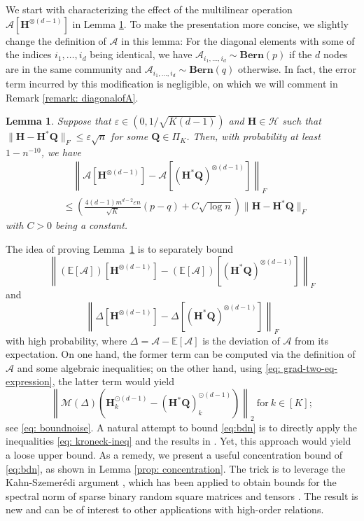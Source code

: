 \documentclass{article}
\theoremstyle{plain}
\newtheorem{lemma}[theorem]{Lemma}
\theoremstyle{definition}
\theoremstyle{remark}
\newcommand{\BH}{\bm{H}}
\newcommand{\BQ}{\bm{Q}}
\newcommand{\HCal}{\mathcal{H}}
\newcommand{\ACal}{\mathcal{A}}
\newcommand{\EE}{{\mathbb{E}}}
\begin{document}
We start with characterizing the effect of the multilinear operation $\ACal[\BH^{\otimes(d-1)}]$ in Lemma \ref{eq: lemma-multi-linear}. To make the presentation more concise, we slightly change the definition of $\ACal$ in this lemma: For the diagonal elements with some of the indices $i_1,\ldots,i_d$ being identical, we have
$\ACal_{i_1,\dots,i_d} \sim \mathbf{Bern}(p)$ if the $d$ nodes are in the same community and $\ACal_{i_1,\dots,i_d} \sim \mathbf{Bern}(q)$ otherwise. In fact, the error term incurred by this modification is negligible, on which we will comment in Remark \ref{remark: diagonalofA}.
\begin{lemma} \label{eq: lemma-multi-linear}
	Suppose that $\varepsilon \in \left(0,1/\sqrt{K(d-1)}\right) $ and $\bm{H} \in \HCal$ such that $\| \bm{H} - \bm{H}^*\BQ \|_F \leq \varepsilon \sqrt{n}$ for some $\BQ \in \Pi_K$. Then, with probability at least $1-n^{-10}$, we have
	\begin{align} \label{eq: multi-linear}
		& \quad \left\| \ACal\left[\bm{H}^{\otimes (d-1)}\right] - \ACal\left[ (\bm{H}^*\BQ)^{\otimes (d-1)}\right] \right\|_F \nonumber \\ 
		& \leq \left(\frac{4(d-1)m^{d-2}\varepsilon n}{\sqrt{K}} (p-q) + C\sqrt{\log n} \right) \|\bm{H} - \bm{H}^*\BQ\|_F
	\end{align}  
	with $C>0$ being a constant.
\end{lemma}

	The idea of proving Lemma~\ref{eq: lemma-multi-linear} is to separately bound
\[
\left\| (\EE[\ACal])\left[\bm{H}^{\otimes (d-1)}\right] - (\EE[\ACal])\left[ (\bm{H}^*\BQ)^{\otimes (d-1)}\right] \right\|_F
\]
and 
\[
\left\| \Delta\left[\bm{H}^{\otimes (d-1)}\right] - \Delta\left[ (\bm{H}^*\BQ)^{\otimes (d-1)}\right] \right\|_F
\]
with high probability, where $\Delta = \ACal - \EE [\ACal]$ is the deviation of $\ACal$ from its expectation. On one hand, the former term can be computed via the definition of $\ACal$ and some algebraic inequalities; on the other hand, using \eqref{eq: grad-two-eq-expression}, the latter term would yield
\begin{equation} \label{eq:bdn}
    \left \| \mathcal{M}(\Delta) \left(\bm{H}_k^{\odot (d-1)} - (\bm{H}^*\bm{Q})_k^{\odot (d-1)} \right) \right\|_2~\text{for}~ k\in [K];
\end{equation}
see \eqref{eq: boundnoise}. A natural attempt to bound \eqref{eq:bdn} is to directly apply the inequalities \eqref{eq: kroneck-ineq} and the results in \citet[Theorem 2.3; Remark 2.2; Lemma 6.1]{zhou2021sparse}. Yet, this approach would yield a loose upper bound. As a remedy, we present a useful concentration bound of \eqref{eq:bdn}, as shown in Lemma \ref{prop: concentration}. The trick is to leverage the Kahn-Szemer{\'e}di argument \citep{feige2005spectral}, which has been applied to obtain bounds for the spectral norm of sparse binary random square matrices \citep{lei2015consistency} and tensors \citep{zhou2021sparse}. The result is new and can be of interest to other applications with high-order relations.
\end{document}
